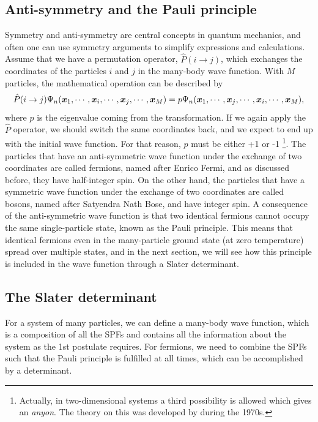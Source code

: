 \subsection{Anti-symmetry and the Pauli principle} \label{sec:symmetry}
Symmetry and anti-symmetry are central concepts in quantum mechanics, and often one can use symmetry arguments to simplify expressions and calculations. Assume that we have a permutation operator, $\hat{P}(i\rightarrow j)$, which exchanges the coordinates of the particles $i$ and $j$ in the many-body wave function. With $M$ particles, the mathematical operation can be described by
\begin{equation}
\hat{P}(i\rightarrow j)\Psi_n(\boldsymbol{{x}}_1,\cdots,\boldsymbol{{x}}_i,\cdots,\boldsymbol{{x}}_j,\cdots,\boldsymbol{{x}}_M)=p\Psi_n(\boldsymbol{{x}}_1,\cdots,\boldsymbol{{x}}_j,\cdots,\boldsymbol{{x}}_i,\cdots,\boldsymbol{{x}}_M),
\end{equation}
where $p$ is the eigenvalue coming from the transformation. If we again apply the $\hat{P}$ operator, we should switch the same coordinates back, and we expect to end up with the initial wave function. For that reason, $p$ must be either +1 or -1 \footnote{Actually, in two-dimensional systems a third possibility is allowed which gives an \textit{anyon}. The theory on this was developed by \citet{leinaas_one_1977} during the 1970s.}. The particles that have an anti-symmetric wave function under the exchange of two coordinates are called fermions, named after Enrico Fermi, and as discussed before, they have half-integer spin. On the other hand, the particles that have a symmetric wave function under the exchange of two coordinates are called bosons, named after Satyendra Nath Bose, and have integer spin. A consequence of the anti-symmetric wave function is that two identical fermions cannot occupy the same single-particle state, known as the Pauli principle. This means that identical fermions even in the many-particle ground state (at zero temperature) spread over multiple states, and in the next section, we will see how this principle is included in the wave function through a Slater determinant. 

\subsection{The Slater determinant} \label{sec:slater}
For a system of many particles, we can define a many-body wave function, which is a composition of all the SPFs and contains all the information about the system as the 1st postulate requires. For fermions, we need to combine the SPFs such that the Pauli principle is fulfilled at all times, which can be accomplished by a determinant. 


